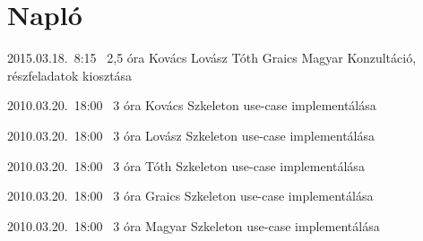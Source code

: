 %
\pagebreak
\section{Napló}

\begin{naplo}

\bejegyzes
{2015.03.18.~8:15~} %
{2,5 óra} %
{Kovács\newline
Lovász\newline
Tóth\newline
Graics\newline
Magyar
} %
{Konzultáció, részfeladatok kiosztása}

\bejegyzes
{2010.03.20.~18:00~}
{3 óra}
{Kovács}
{Szkeleton use-case implementálása}

\bejegyzes
{2010.03.20.~18:00~}
{3 óra}
{Lovász}
{Szkeleton use-case implementálása}

\bejegyzes
{2010.03.20.~18:00~}
{3 óra}
{Tóth}
{Szkeleton use-case implementálása}

\bejegyzes
{2010.03.20.~18:00~}
{3 óra}
{Graics}
{Szkeleton use-case implementálása}

\bejegyzes
{2010.03.20.~18:00~}
{3 óra}
{Magyar}
{Szkeleton use-case implementálása}

\end{naplo}

